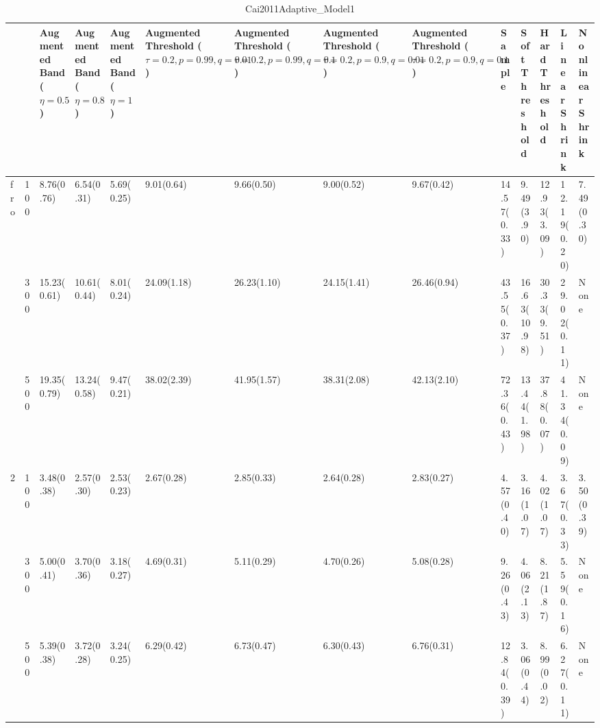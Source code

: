 \begin{table}[htbp]
\centering
\caption{Cai2011Adaptive_Model1}
\label{my label}
\begin{tabular}{ll|p{2cm}p{2cm}p{2cm}p{2cm}p{2cm}p{2cm}p{2cm}p{2cm}p{2cm}p{2cm}p{2cm}p{2cm}}
\toprule
  &     & Augmented Band ($\eta=0.5$) & Augmented Band ($\eta=0.8$) & Augmented Band ($\eta=1$) & Augmented Threshold ($\tau=0.2, p=0.99, q=0.01$) & Augmented Threshold ($\tau=0.2, p=0.99, q=0.1$) & Augmented Threshold ($\tau=0.2, p=0.9, q=0.01$) & Augmented Threshold ($\tau=0.2, p=0.9, q=0.1$) &       Sample & Soft Threshold & Hard Threshold & Linear Shrink & Nonlinear Shrink \\
\midrule
fro & 100 &                  8.76(0.76) &                  6.54(0.31) &                5.69(0.25) &                                       9.01(0.64) &                                      9.66(0.50) &                                      9.00(0.52) &                                     9.67(0.42) &  14.57(0.33) &     9.49(3.90) &    12.93(3.09) &   12.19(0.20) &       7.49(0.30) \\
  & 300 &                 15.23(0.61) &                 10.61(0.44) &                8.01(0.24) &                                      24.09(1.18) &                                     26.23(1.10) &                                     24.15(1.41) &                                    26.46(0.94) &  43.55(0.37) &   16.63(10.98) &    30.33(9.51) &   29.02(0.11) &             None \\
  & 500 &                 19.35(0.79) &                 13.24(0.58) &                9.47(0.21) &                                      38.02(2.39) &                                     41.95(1.57) &                                     38.31(2.08) &                                    42.13(2.10) &  72.36(0.43) &    13.44(1.98) &    37.88(0.07) &   41.34(0.09) &             None \\
2 & 100 &                  3.48(0.38) &                  2.57(0.30) &                2.53(0.23) &                                       2.67(0.28) &                                      2.85(0.33) &                                      2.64(0.28) &                                     2.83(0.27) &   4.57(0.40) &     3.16(1.07) &     4.02(1.07) &    3.67(0.33) &       3.50(0.39) \\
  & 300 &                  5.00(0.41) &                  3.70(0.36) &                3.18(0.27) &                                       4.69(0.31) &                                      5.11(0.29) &                                      4.70(0.26) &                                     5.08(0.28) &   9.26(0.43) &     4.06(2.13) &     8.21(1.87) &    5.59(0.16) &             None \\
  & 500 &                  5.39(0.38) &                  3.72(0.28) &                3.24(0.25) &                                       6.29(0.42) &                                      6.73(0.47) &                                      6.30(0.43) &                                     6.76(0.31) &  12.84(0.39) &     3.06(0.44) &     8.99(0.02) &    6.27(0.11) &             None \\
\bottomrule
\end{tabular}
\end{table}
